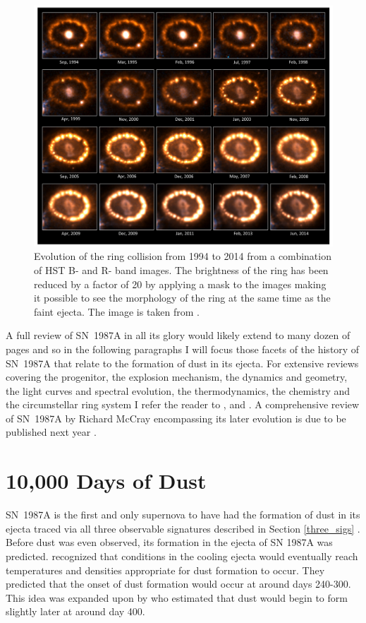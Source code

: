 \begin{figure}
\centering
\includegraphics[clip=true,scale=0.4,trim= 0 0 0 0]{chapters/chapter5/images/HST_ring.png}
\caption{Evolution of the ring collision from 1994 to 2014 from a combination of HST B- and R- band images.  The brightness of the ring has been reduced by a factor of 20 by applying a mask to the images making it possible to see the morphology of the ring at the same time as the faint ejecta.  The image is taken from \citep{Fransson2015}.}
\label{HST_ring}
\end{figure}

A full review of SN~1987A in all its glory would likely extend to many dozen of pages and so in the following paragraphs I will focus those facets of the history of SN~1987A that relate to the formation of dust in its ejecta.  For extensive reviews covering the progenitor, the explosion mechanism, the dynamics and geometry, the light curves and spectral evolution, the thermodynamics, the chemistry and the circumstellar ring system I refer the reader to \citet{Arnett1989}, \citet{McCray1993} and \citet{McCray2003}.  A comprehensive review of SN~1987A by Richard McCray encompassing its later evolution is due to be published next year \citep{McCray2016}.



\section{10,000 Days of Dust}
SN~1987A is the first and only supernova to have had the formation of dust in its ejecta traced via all three observable signatures described in Section \ref{three_sigs} \citep{Bouchet2014}.  Before dust was even observed, its formation in the ejecta of SN 1987A was predicted.  \citet{Gehrz1987} recognized that conditions in the cooling ejecta would eventually reach temperatures and densities appropriate for dust formation to occur.  They predicted that the onset of dust formation would occur at around days 240-300.  This idea was expanded upon by \citet{Dwek1988} who estimated that dust would begin to form slightly later at around day 400.

